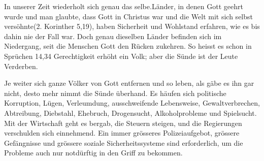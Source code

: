 \documentclass{../inc/mybibbook}
\begin{document}
In unserer Zeit wiederholt sich genau das selbe.Länder, in denen Gott geehrt wurde und man glaubte, dass \flqq Gott in Christus war und die Welt mit sich selbst versöhnte\frqq{}(2. Korinther 5,19), haben Sicherheit und Wohlstand erfahren, wie es bis dahin nie der Fall war. Doch genau dieselben Länder befinden sich im Niedergang, seit die Menschen Gott den Rücken zukehren. So heisst es schon in Sprüchen 14,34 \flqq Gerechtigkeit erhöht ein Volk; aber die Sünde ist der Leute Verderben.\frqq

Je weiter sich ganze Völker von Gott entfernen und so leben, als gäbe es ihn gar nicht, desto mehr nimmt die Sünde überhand. Es häufen sich politische Korruption, Lügen, Verleumdung, ausschweifende Lebensweise, Gewaltverbrechen, Abtreibung, Diebstahl, Ehebruch, Drogensucht, Alkoholprobleme und Spielsucht. Mit der Wirtschaft geht es bergab, die Steuern steigen, und die Regierungen verschulden sich einnehmend. Ein immer grösseres Polizeiaufgebot, grössere Gefängnisse und grössere soziale Sicherheitssysteme sind erforderlich, um die Probleme auch nur notdürftig in den Griff zu bekommen.
\end{document}

